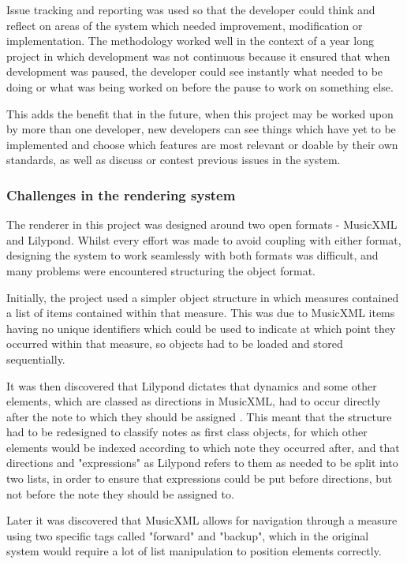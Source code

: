Issue tracking and reporting was used so that the developer could think and reflect on areas of the system which needed improvement, modification or implementation. The methodology worked well in the context of a year long project in which development was not continuous because it ensured that when development was paused, the developer could see instantly what needed to be doing or what was being worked on before the pause to work on something else. 

This adds the benefit that in the future, when this project may be worked upon by more than one developer, new developers can see things which have yet to be implemented and choose which features are most relevant or doable by their own standards, as well as discuss or contest previous issues in the system.


\subsubsection{Challenges in the rendering system}
The renderer in this project was designed around two open formats - MusicXML and Lilypond. Whilst every effort was made to avoid coupling with either format, designing the system to work seamlessly with both formats was difficult, and many problems were encountered structuring the object format.

Initially, the project used a simpler object structure in which measures contained a list of items contained within that measure. This was due to MusicXML items having no unique identifiers which could be used to indicate at which point they occurred within that measure, so objects had to be loaded and stored sequentially.

It was then discovered that Lilypond dictates that dynamics and some other elements, which are classed as directions in MusicXML, had to occur directly after the note to which they should be assigned %
. This meant that the structure had to be redesigned to classify notes as first class objects, for which other elements would be indexed according to which note they occurred after, and that directions and "expressions" as Lilypond refers to them as needed to be split into two lists, in order to ensure that expressions could be put before directions, but not before the note they should be assigned to.

Later it was discovered that MusicXML allows for navigation through a measure using two specific tags called "forward" and "backup", which in the original system would require a lot of list manipulation to position elements correctly. 

